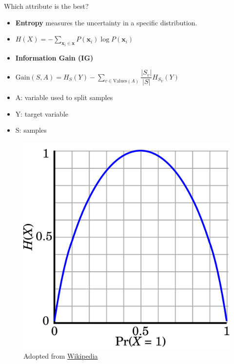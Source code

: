 \documentclass[serif, aspectratio=169]{beamer}
\begin{document}
\begin{frame}{Which attribute is the best?}
    \begin{itemize}
        \itemsep1em
        \justifying
        \item \textbf{Entropy} measures the uncertainty in a specific distribution.
        \item[] \begin{center}
            $H(X) = -\displaystyle\sum_{\boldsymbol{x}_i \in \boldsymbol{x}} P(\boldsymbol{x}_i)\log P(\boldsymbol{x}_i)$
        \end{center}
        \item \textbf{Information Gain (IG)}
        \item[] \begin{center}
            $\text{Gain}(S, A) = H_S(Y) - \displaystyle\sum_{v \in \text{Values}(A)} \dfrac{\vert S_v\vert}{\vert S\vert}H_{S_V}(Y)$
        \end{center}
    \end{itemize}
    \begin{itemize}
        \itemsep0.25em
        \justifying
        \item[] A: variable used to split samples
        \item[] Y: target variable
        \item[] S: samples
    \end{itemize}
    \endminipage
    \hfill
    \begin{figure}[!htb]
        \includegraphics[width=\linewidth]{pic/entropy.png}
        {\scriptsize Adopted from \href{https://en.wikipedia.org/wiki/Binary_entropy_function}{Wikipedia}}
    \end{figure}
    \endminipage
\end{frame}
\end{document}
